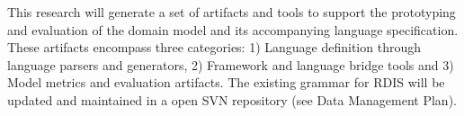 This research will generate a set of artifacts and tools to support the prototyping and evaluation of the domain model and its accompanying language specification.  These artifacts encompass three categories: 1) Language definition through language parsers and generators, 2) Framework and language bridge tools and 3) Model metrics and evaluation artifacts.  The existing grammar for RDIS will be updated and maintained in a open SVN repository (see Data Management Plan).\newline
